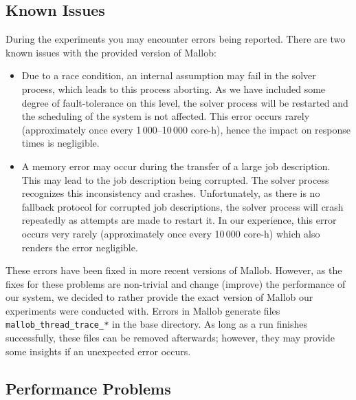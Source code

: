 \documentclass[runningheads]{article}
\numberwithin{dummy}{subsection}
\begin{document}
\subsection{Known Issues}

During the experiments you may encounter errors being reported.
There are two known issues with the provided version of Mallob:
\begin{itemize}
 \item Due to a race condition, an internal assumption may fail in the solver process, which leads to this process aborting. As we have included some degree of fault-tolerance on this level, the solver process will be restarted and the scheduling of the system is not affected. This error occurs rarely (approximately once every 1\,000--10\,000 core-h), hence the impact on response times is negligible.
 \item A memory error may occur during the transfer of a large job description. This may lead to the job description being corrupted. The solver process recognizes this inconsistency and crashes. Unfortunately, as there is no fallback protocol for corrupted job descriptions, the solver process will crash repeatedly as attempts are made to restart it.
 In our experience, this error occurs very rarely (approximately once every 10\,000 core-h) which also renders the error negligible.
\end{itemize}
These errors have been fixed in more recent versions of Mallob.
However, as the fixes for these problems are non-trivial and change (improve) the performance of our system, we decided to rather provide the exact version of Mallob our experiments were conducted with.
Errors in Mallob generate files \texttt{mallob\_thread\_trace\_*} in the base directory.
As long as a run finishes successfully, these files can be removed afterwards; however, they may provide some insights if an unexpected error occurs.

\subsection{Performance Problems}
\end{document}
